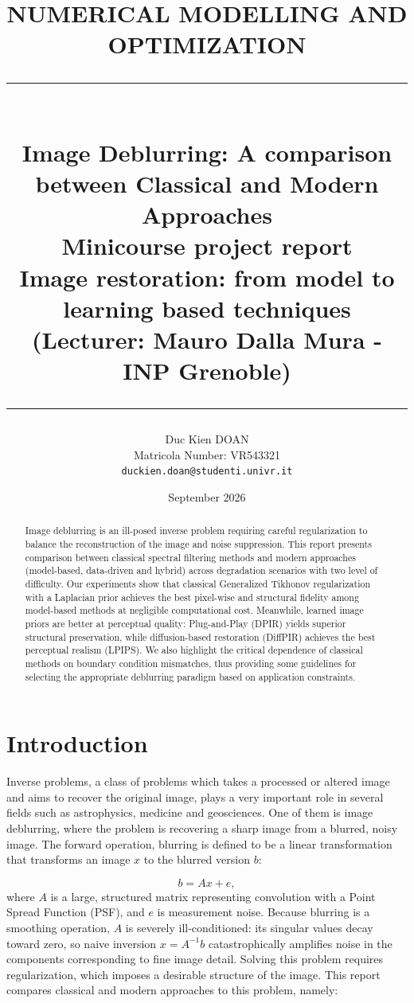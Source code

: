 \documentclass[12pt, a4paper, onecolumn]{article}
\title{
  \vspace{-1cm}
  {\Large \textsc{NUMERICAL MODELLING AND OPTIMIZATION}} \\[0.4em]
  \rule{\linewidth}{0.5pt} \\[0.6em]
  {\LARGE \bfseries Image Deblurring: A comparison between Classical and Modern Approaches} \\[0.3em]
  {\large Minicourse project report \\ Image restoration: from model to learning based techniques \\ (Lecturer: Mauro Dalla Mura - INP Grenoble)} \\[0.3em]                 %
  \rule{\linewidth}{0.5pt}
}
\author{
  Duc Kien DOAN \\                   %
  \small Matricola Number: VR543321 \\        %
  \small \texttt{duckien.doan@studenti.univr.it}  %
}
\date{
  \small September 2026                    %
}
\theoremstyle{plain}          %
\theoremstyle{definition}     %
\theoremstyle{remark}
\begin{document}
\maketitle
\thispagestyle{empty}     %

\begin{abstract}
  \noindent
  Image deblurring is an ill-posed inverse problem requiring careful regularization to balance the reconstruction of the image and noise suppression. This report presents  comparison between classical spectral filtering methods and modern approaches (model-based, data-driven and hybrid) across degradation scenarios with two level of difficulty. Our experiments show that classical Generalized Tikhonov regularization with a Laplacian prior achieves the best pixel-wise and structural fidelity among model-based methods at negligible computational cost. Meanwhile, learned image priors are better at perceptual quality: Plug-and-Play (DPIR) yields superior structural preservation, while diffusion-based restoration (DiffPIR) achieves the best perceptual realism (LPIPS). We also highlight the critical dependence of classical methods on boundary condition mismatches, thus providing some guidelines for selecting the appropriate deblurring paradigm based on application constraints.
\end{abstract}

\newpage

\tableofcontents
\newpage

\section{Introduction}
Inverse problems, a class of problems which takes a processed or altered image and aims to recover the original image, plays a very important role in several fields such as astrophysics, medicine and geosciences. One of them is image deblurring, where the problem is recovering a sharp image from a blurred, noisy image. The forward operation, blurring is defined to be a linear transformation that transforms an image $x$ to the blurred version $b$: 

\begin{equation}
    b = Ax + e,
    \label{eq:forward}
\end{equation}
where $A$ is a large, structured matrix representing convolution with a Point Spread Function (PSF), and $e$ is measurement noise. Because blurring
is a smoothing operation, $A$ is severely ill-conditioned: its singular values decay toward zero, so naive inversion $x = A^{-1}b$ catastrophically
amplifies noise in the components corresponding to fine image detail. Solving this problem requires regularization, which imposes a desirable structure of the image. This report compares classical and modern approaches to this problem, namely:
\end{document}

